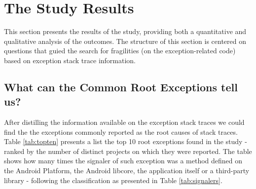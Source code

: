 \documentclass[conference]{IEEEtran}
\begin{document}
\section{The Study Results}
\label{sec:result}

This section presents the results of the study, providing both a
quantitative and qualitative analysis of the outcomes. The structure of this section
 is centered on questions that guied the search for fragilities (on the exception-related code)
based on exception stack trace information.

\subsection{What can the Common Root Exceptions tell us? }

After distilling the information available on the exception stack traces we could find 
the the exceptions commonly reported as the root causes of stack traces.
Table \ref{tab:topten} presents a list the top 10 root exceptions found in the study - 
 ranked by the number of distinct projects on which they were reported. 
The table shows how many times the signaler of such exception was a method defined on
the Android Platform, the Android libcore, the application itself or a third-party library -
 following the classification as presented in Table  \ref{tab:signalers}. 
\end{document}
